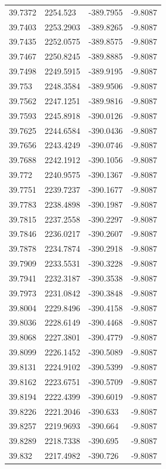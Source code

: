 \begin{table}[H]
\begin{tabular}{llll}
39.7372 & 2254.523 & -389.7955 & -9.8087 \\
39.7403 & 2253.2903 & -389.8265 & -9.8087 \\
39.7435 & 2252.0575 & -389.8575 & -9.8087 \\
39.7467 & 2250.8245 & -389.8885 & -9.8087 \\
39.7498 & 2249.5915 & -389.9195 & -9.8087 \\
39.753 & 2248.3584 & -389.9506 & -9.8087 \\
39.7562 & 2247.1251 & -389.9816 & -9.8087 \\
39.7593 & 2245.8918 & -390.0126 & -9.8087 \\
39.7625 & 2244.6584 & -390.0436 & -9.8087 \\
39.7656 & 2243.4249 & -390.0746 & -9.8087 \\
39.7688 & 2242.1912 & -390.1056 & -9.8087 \\
39.772 & 2240.9575 & -390.1367 & -9.8087 \\
39.7751 & 2239.7237 & -390.1677 & -9.8087 \\
39.7783 & 2238.4898 & -390.1987 & -9.8087 \\
39.7815 & 2237.2558 & -390.2297 & -9.8087 \\
39.7846 & 2236.0217 & -390.2607 & -9.8087 \\
39.7878 & 2234.7874 & -390.2918 & -9.8087 \\
39.7909 & 2233.5531 & -390.3228 & -9.8087 \\
39.7941 & 2232.3187 & -390.3538 & -9.8087 \\
39.7973 & 2231.0842 & -390.3848 & -9.8087 \\
39.8004 & 2229.8496 & -390.4158 & -9.8087 \\
39.8036 & 2228.6149 & -390.4468 & -9.8087 \\
39.8068 & 2227.3801 & -390.4779 & -9.8087 \\
39.8099 & 2226.1452 & -390.5089 & -9.8087 \\
39.8131 & 2224.9102 & -390.5399 & -9.8087 \\
39.8162 & 2223.6751 & -390.5709 & -9.8087 \\
39.8194 & 2222.4399 & -390.6019 & -9.8087 \\
39.8226 & 2221.2046 & -390.633 & -9.8087 \\
39.8257 & 2219.9693 & -390.664 & -9.8087 \\
39.8289 & 2218.7338 & -390.695 & -9.8087 \\
39.832 & 2217.4982 & -390.726 & -9.8087 \\

\end{tabular}
\end{table}
